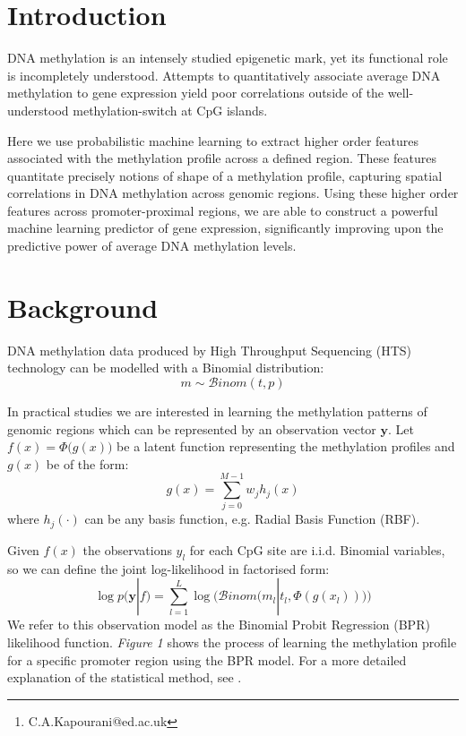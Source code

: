 \documentclass{article}\usepackage[]{graphicx}\usepackage[usenames,dvipsnames]{color}
\author{Chantriolnt-Andreas Kapourani\footnote{C.A.Kapourani@ed.ac.uk}}
\date{Modified: 29 July, 2016. Compiled: \today}
\begin{document}
\maketitle

\tableofcontents

\section{Introduction}
DNA methylation is an intensely studied epigenetic mark, yet its functional role is incompletely understood. Attempts to quantitatively associate average DNA methylation to gene expression yield poor correlations outside of the well-understood methylation-switch at CpG islands.

Here we use probabilistic machine learning to extract higher order features associated with the methylation profile across a defined region. These features quantitate precisely notions of shape of a methylation profile, capturing spatial correlations in DNA methylation across genomic regions.  Using these higher order features across promoter-proximal regions, we are able to construct a powerful machine learning predictor of gene expression, significantly improving upon the predictive power of average DNA methylation levels.

\section{Background}
DNA methylation data produced by High Throughput Sequencing (HTS) technology can be modelled with a Binomial distribution:
\begin{equation}
  m \sim \mathcal{B}inom(t, p)
\end{equation}

In practical studies we are interested in learning the methylation patterns of genomic regions which can be represented by an observation vector $\mathbf{y}$. Let $f(x) = \Phi \big(g(x)\big)$ be a latent function representing the methylation profiles and $g(x)$ be of the form:
\begin{equation}
	 g(x) = \sum\limits_{j=0}^{M-1} w_{j} h_{j}(x)
\end{equation}
where $h_{j}(\cdot)$ can be any basis function, e.g. Radial Basis Function (RBF).

Given $f(x)$ the observations $y_{l}$ for each CpG site are i.i.d. Binomial variables, so we can define the joint log-likelihood in factorised form:
\begin{equation} \label{eq:bpr-likelihood}
 \log p(\mathbf{y} | f) = \sum\limits_{l = 1}^{L} \log \bigg( \mathcal{B}inom\big(m_{l} | t_{l}, \Phi(g(x_{l}))\big) \bigg)
\end{equation}
We refer to this observation model as the Binomial Probit Regression (BPR) likelihood function. \emph{Figure 1} shows the process of learning the methylation profile for a specific promoter region using the BPR model. For a more detailed explanation of the statistical method, see \cite{Kapourani2016}.
\end{document}
